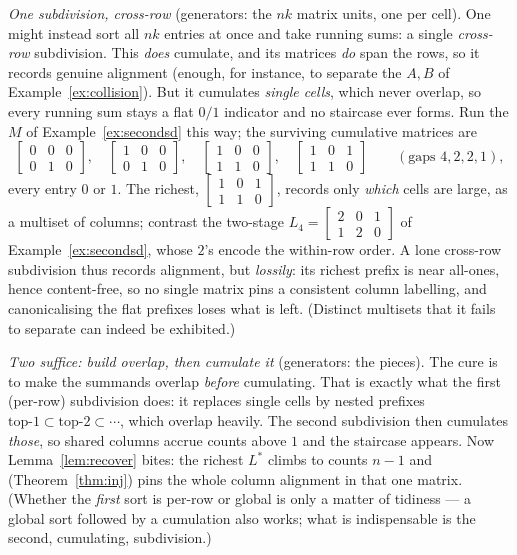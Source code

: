 \documentclass[11pt,a4paper]{article}
\theoremstyle{definition}
\theoremstyle{plain}
\begin{document}
\emph{One subdivision, cross-row} (generators: the $nk$ matrix units, one per
cell). One might instead sort all $nk$ entries at once and take running sums: a
single \emph{cross-row} subdivision. This
\emph{does} cumulate, and its matrices \emph{do} span the rows, so it records
genuine alignment (enough, for instance, to separate the $A,B$ of
Example~\ref{ex:collision}). But it cumulates \emph{single cells}, which never
overlap, so every running sum stays a flat $0/1$ indicator and no staircase ever
forms. Run the $M$ of Example~\ref{ex:secondsd} this way; the surviving
cumulative matrices are
\[
 \left[\begin{smallmatrix}0&0&0\\0&1&0\end{smallmatrix}\right],\quad
 \left[\begin{smallmatrix}1&0&0\\0&1&0\end{smallmatrix}\right],\quad
 \left[\begin{smallmatrix}1&0&0\\1&1&0\end{smallmatrix}\right],\quad
 \left[\begin{smallmatrix}1&0&1\\1&1&0\end{smallmatrix}\right]
 \qquad(\text{gaps }4,2,2,1),
\]
every entry $0$ or $1$. The richest,
$\left[\begin{smallmatrix}1&0&1\\1&1&0\end{smallmatrix}\right]$, records only
\emph{which} cells are large, as a multiset of columns; contrast the two-stage
$L_4=\left[\begin{smallmatrix}2&0&1\\1&2&0\end{smallmatrix}\right]$ of
Example~\ref{ex:secondsd}, whose $2$'s encode the within-row order. A lone
cross-row subdivision thus records alignment, but \emph{lossily}: its richest
prefix is near all-ones, hence content-free, so no single matrix pins a
consistent column labelling, and canonicalising the flat prefixes loses what is
left. (Distinct multisets that it fails to separate can indeed be exhibited.)

\emph{Two suffice: build overlap, then cumulate it} (generators: the pieces).
The cure is to make the summands overlap \emph{before} cumulating. That is exactly what the first
(per-row) subdivision does: it replaces single cells by nested prefixes
$\text{top-}1\subset\text{top-}2\subset\cdots$, which overlap heavily. The second
subdivision then cumulates \emph{those}, so shared columns accrue counts above
$1$ and the staircase appears. Now Lemma~\ref{lem:recover} bites: the richest
$L^\ast$ climbs to counts $n-1$ and (Theorem~\ref{thm:inj}) pins the whole
column alignment in that one matrix. (Whether the \emph{first} sort is per-row or
global is only a matter of tidiness --- a global sort followed by a cumulation
also works; what is indispensable is the second, cumulating, subdivision.)
\end{document}
